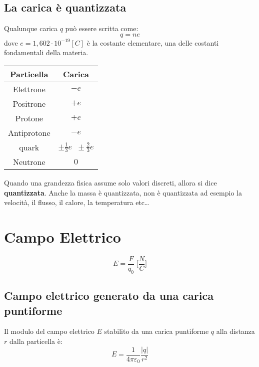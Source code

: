         \subsection{La carica è quantizzata} Qualunque carica $q$ può essere
        scritta come:
            \begin{equation}
                q = ne
            \end{equation}
        dove $e = 1,602\cdot10^{-19} [C]$ è la costante elementare, una delle
        costanti fondamentali della materia.
        \begin{center}
            \begin{tabular}{ |c|c| } 
                \hline
                Particella & Carica \\
                \hline
                Elettrone & $- e$ \\
                Positrone & $+ e$ \\
                Protone & $+ e$ \\
                Antiprotone & $- e$ \\
                quark & $\pm \frac{1}{3}e \;\; \pm \frac{2}{3}e$ \\
                Neutrone & $0$ \\
                \hline
            \end{tabular}
        \end{center}
        Quando una grandezza fisica assume solo valori discreti, allora si dice
        \textbf{quantizzata}. Anche la massa è quantizzata, non è quantizzata ad
        esempio la velocità, il flusso, il calore, la temperatura etc\dots

        \section{Campo Elettrico}
            \begin{equation}
                E = \frac{F}{q_0}\;\Bigg[\frac{N}{C}\Bigg]
            \end{equation}

            \subsection{Campo elettrico generato da una carica puntiforme} Il 
            modulo del campo elettrico $E$ stabilito da una carica puntiforme 
            $q$ alla distanza $r$ dalla particella è:
                \begin{equation}
                    E = \frac{1}{4\pi\varepsilon_0}\frac{|q|}{r^2}
                \end{equation}

